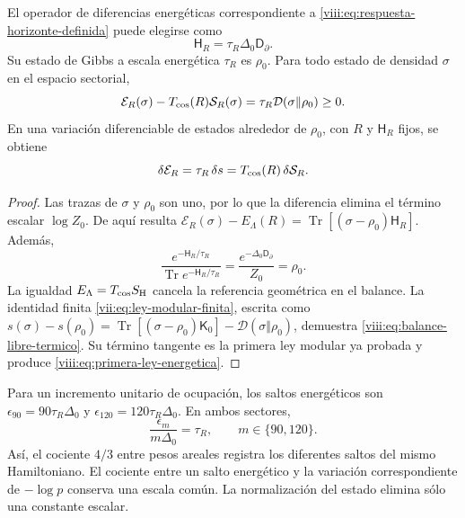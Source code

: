 \begin{theorem}
\label{viii:thm:hamiltoniano-respuesta-termica}
El operador de diferencias energéticas correspondiente a
\eqref{viii:eq:respuesta-horizonte-definida} puede elegirse como
\begin{equation}
 \mathsf H_R=\tau_R\Delta_0\mathsf D_\partial.
 \label{viii:eq:hamiltoniano-respuesta}
\end{equation}
Su estado de Gibbs a escala energética \(\tau_R\) es \(\rho_0\).
Para todo estado de densidad \(\sigma\) en el espacio sectorial,
\begin{equation}
 \mathcal E_R(\sigma)-T_{\rm cos}(R)\mathcal S_R(\sigma)
 =\tau_R\mathcal D(\sigma\Vert\rho_0)\geq0.
 \label{viii:eq:balance-libre-termico}
\end{equation}
En una variación diferenciable de estados alrededor de \(\rho_0\),
con \(R\) y \(\mathsf H_R\) fijos, se obtiene
\begin{equation}
 \delta\mathcal E_R
 =\tau_R\,\delta s
 =T_{\rm cos}(R)\,\delta\mathcal S_R.
 \label{viii:eq:primera-ley-energetica}
\end{equation}
\end{theorem}
\begin{proof}
Las trazas de \(\sigma\) y \(\rho_0\) son uno, por lo que la
diferencia elimina el término escalar \(\log Z_0\). De aquí resulta
\(\mathcal E_R(\sigma)-E_\Lambda(R)
=\operatorname{Tr}[(\sigma-\rho_0)\mathsf H_R]\).
Además,
\[
 \frac{e^{-\mathsf H_R/\tau_R}}
 {\operatorname{Tr}e^{-\mathsf H_R/\tau_R}}
 =\frac{e^{-\Delta_0\mathsf D_\partial}}{Z_0}=\rho_0.
\]
La igualdad \(E_\Lambda=T_{\rm cos}S_{\rm H}\) cancela la
referencia geométrica en el balance. La identidad finita
\eqref{vii:eq:ley-modular-finita}, escrita como
\(s(\sigma)-s(\rho_0)
=\operatorname{Tr}[(\sigma-\rho_0)\mathsf K_0]
-\mathcal D(\sigma\Vert\rho_0)\), demuestra
\eqref{viii:eq:balance-libre-termico}. Su término tangente es la
primera ley modular ya probada y produce
\eqref{viii:eq:primera-ley-energetica}.
\end{proof}

Para un incremento unitario de ocupación, los saltos energéticos son
\(\epsilon_{90}=90\tau_R\Delta_0\) y
\(\epsilon_{120}=120\tau_R\Delta_0\). En ambos sectores,
\begin{equation}
 \frac{\epsilon_m}{m\Delta_0}=\tau_R,
 \qquad m\in\{90,120\}.
 \label{viii:eq:pendiente-termica-comun}
\end{equation}
Así, el cociente \(4/3\) entre pesos areales registra los diferentes
saltos del mismo Hamiltoniano. El cociente entre un salto energético y
la variación correspondiente de \(-\log p\) conserva una escala común.
La normalización del estado elimina sólo una constante escalar.

